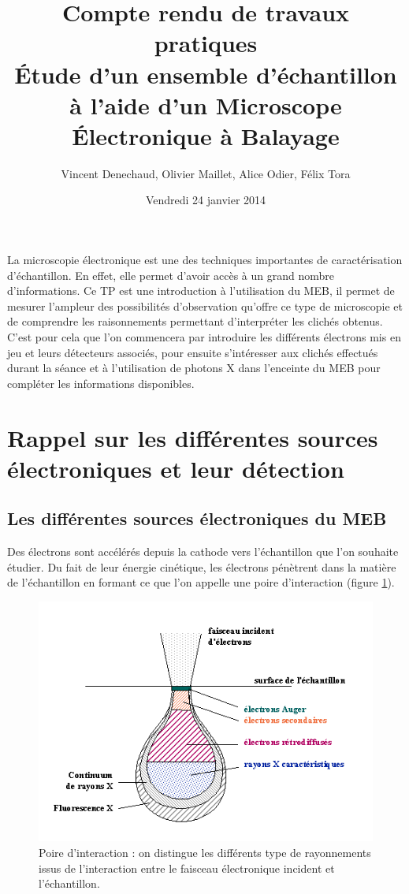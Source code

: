 \documentclass[a4paper,12pt]{article}
\title{\Large Compte rendu de travaux pratiques\\ Étude d'un ensemble d'échantillon à l'aide d'un Microscope Électronique à Balayage}
\author{Vincent Denechaud, Olivier Maillet, Alice Odier, Félix Tora}
\date{Vendredi 24 janvier 2014}
\begin{document}
\maketitle

La microscopie électronique est une des techniques importantes de caractérisation d'échantillon. En effet, elle permet d'avoir accès à un grand nombre d'informations. Ce TP est une introduction à l'utilisation du MEB, il permet de mesurer l'ampleur des possibilités d'observation qu'offre ce type de microscopie et de comprendre les raisonnements permettant d'interpréter les clichés obtenus. C'est pour cela que l'on commencera par introduire les différents électrons mis en jeu et leurs détecteurs associés, pour ensuite s'intéresser aux clichés effectués durant la séance et à l'utilisation de photons X dans l'enceinte du MEB pour compléter les informations disponibles.


\section{Rappel sur les différentes sources électroniques et leur détection}


\subsection{Les différentes sources électroniques du MEB}

Des électrons sont accélérés depuis la cathode vers l'échantillon que l'on souhaite étudier. Du fait de leur énergie cinétique, les électrons pénètrent dans la matière de l'échantillon en formant ce que l'on appelle une poire d'interaction (figure \ref{fig:poire_int}).

\begin{figure}
\centering
\includegraphics[width = 0.8 \textwidth]{images/poire_int.png}
\caption{Poire d'interaction : on distingue les différents type de rayonnements issus de l'interaction entre le faisceau électronique incident et l'échantillon.}
\label{fig:poire_int}
\end{figure}
\end{document}
